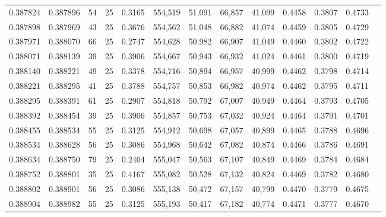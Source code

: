 \begin{tabular}{rrrrrrrrrrrrr}
0.387824 & 0.387896 &    54 &  25 &                                     0.3165 & 554,519 &  51,091 &  66,857 &  41,099 & 0.4458 & 0.3807 & 0.4733 \\
0.387898 & 0.387969 &    43 &  25 &                                     0.3676 & 554,562 &  51,048 &  66,882 &  41,074 & 0.4459 & 0.3805 & 0.4729 \\
0.387971 & 0.388070 &    66 &  25 &                                     0.2747 & 554,628 &  50,982 &  66,907 &  41,049 & 0.4460 & 0.3802 & 0.4722 \\
0.388071 & 0.388139 &    39 &  25 &                                     0.3906 & 554,667 &  50,943 &  66,932 &  41,024 & 0.4461 & 0.3800 & 0.4719 \\
0.388140 & 0.388221 &    49 &  25 &                                     0.3378 & 554,716 &  50,894 &  66,957 &  40,999 & 0.4462 & 0.3798 & 0.4714 \\
0.388221 & 0.388295 &    41 &  25 &                                     0.3788 & 554,757 &  50,853 &  66,982 &  40,974 & 0.4462 & 0.3795 & 0.4711 \\
0.388295 & 0.388391 &    61 &  25 &                                     0.2907 & 554,818 &  50,792 &  67,007 &  40,949 & 0.4464 & 0.3793 & 0.4705 \\
0.388392 & 0.388454 &    39 &  25 &                                     0.3906 & 554,857 &  50,753 &  67,032 &  40,924 & 0.4464 & 0.3791 & 0.4701 \\
0.388455 & 0.388534 &    55 &  25 &                                     0.3125 & 554,912 &  50,698 &  67,057 &  40,899 & 0.4465 & 0.3788 & 0.4696 \\
0.388534 & 0.388628 &    56 &  25 &                                     0.3086 & 554,968 &  50,642 &  67,082 &  40,874 & 0.4466 & 0.3786 & 0.4691 \\
0.388634 & 0.388750 &    79 &  25 &                                     0.2404 & 555,047 &  50,563 &  67,107 &  40,849 & 0.4469 & 0.3784 & 0.4684 \\
0.388752 & 0.388801 &    35 &  25 &                                     0.4167 & 555,082 &  50,528 &  67,132 &  40,824 & 0.4469 & 0.3782 & 0.4680 \\
0.388802 & 0.388901 &    56 &  25 &                                     0.3086 & 555,138 &  50,472 &  67,157 &  40,799 & 0.4470 & 0.3779 & 0.4675 \\
0.388904 & 0.388982 &    55 &  25 &                                     0.3125 & 555,193 &  50,417 &  67,182 &  40,774 & 0.4471 & 0.3777 & 0.4670 \\

\end{tabular}
